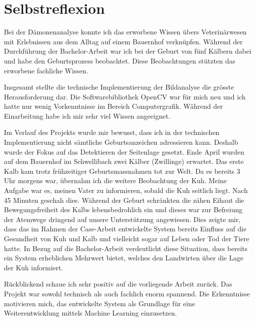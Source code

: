 

\chapter{Selbstreflexion}

Bei der Dämonenanalyse konnte ich das erworbene Wissen übers Veterinärwesen mit Erlebnissen aus dem Alltag auf einem Bauernhof verknüpfen. Während der Durchführung der Bachelor-Arbeit war ich bei der Geburt von fünf Kälbern dabei und habe den Geburtsprozess beobachtet. Diese Beobachtungen stützten das erworbene fachliche Wissen.

Insgesamt stellte die technische Implementierung der Bildanalyse die grösste Herausforderung dar. Die Softwarebibliothek OpenCV war für mich neu und ich hatte nur wenig Vorkenntnisse im Bereich Computergrafik. Während der Einarbeitung habe ich mir sehr viel Wissen angeeignet. 

Im Verlauf des Projekts wurde mir bewusst, dass ich in der technischen Implementierung nicht sämtliche Geburtsanzeichen adressieren kann. Deshalb wurde der Fokus auf das Detektieren der Seitenlage gesetzt. Ende April wurden auf dem Bauernhof im Schwellibach zwei Kälber (Zwillinge) erwartet. Das erste Kalb kam trotz frühzeitiger Geburtsmassnahmen tot zur Welt. Da es bereits 3 Uhr morgens war, übernahm ich die weitere Beobachtung der Kuh. Meine Aufgabe war es, meinen Vater zu informieren, sobald die Kuh seitlich liegt. Nach 45 Minuten geschah dies. Während der Geburt schränkten die zähen \gls{Eihaut} die Bewegungsfreiheit des Kalbs lebensbedrohlich ein und dieses war zur Befreiung der Atemwege dringend auf unsere Unterstützung angewiesen. Dies zeigte mir, dass das im Rahmen der Case-Arbeit entwickelte System bereits Einfluss auf die Gesundheit von Kuh und Kalb und vielleicht sogar auf Leben oder Tod der Tiere hatte. In Bezug auf die Bachelor-Arbeit verdeutlicht diese Situation, dass bereits ein System erheblichen Mehrwert bietet, welches den Landwirten über die Lage der Kuh informiert. 

Rückblickend schaue ich sehr positiv auf die vorliegende Arbeit zurück. Das Projekt war sowohl technisch als auch fachlich enorm spannend. Die Erkenntnisse motivieren mich, das entwickelte System als Grundlage für eine Weiterentwicklung mittels Machine Learning einzusetzen.